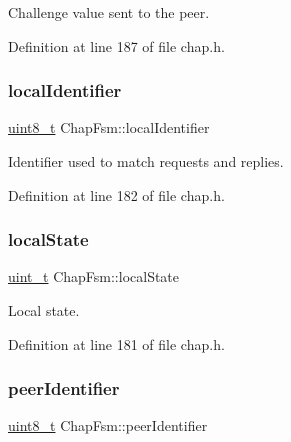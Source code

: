 Challenge value sent to the peer. 



Definition at line 187 of file chap.\+h.

\mbox{\label{structChapFsm_a52f5787d2fa8be42a8c4855248ecb861}} 
\subsubsection{\texorpdfstring{local\+Identifier}{localIdentifier}}
{\footnotesize\ttfamily \hyperlink{stdint_8h_aba7bc1797add20fe3efdf37ced1182c5}{uint8\+\_\+t} Chap\+Fsm\+::local\+Identifier}



Identifier used to match requests and replies. 



Definition at line 182 of file chap.\+h.

\mbox{\label{structChapFsm_a5a6377b76313a2d26c803a7f9eeab9d0}} 
\subsubsection{\texorpdfstring{local\+State}{localState}}
{\footnotesize\ttfamily \hyperlink{compiler__port_8h_a12a1e9b3ce141648783a82445d02b58d}{uint\+\_\+t} Chap\+Fsm\+::local\+State}



Local state. 



Definition at line 181 of file chap.\+h.

\mbox{\label{structChapFsm_ac631bed2f88f031c848bd89aa97028bf}} 
\subsubsection{\texorpdfstring{peer\+Identifier}{peerIdentifier}}
{\footnotesize\ttfamily \hyperlink{stdint_8h_aba7bc1797add20fe3efdf37ced1182c5}{uint8\+\_\+t} Chap\+Fsm\+::peer\+Identifier}



